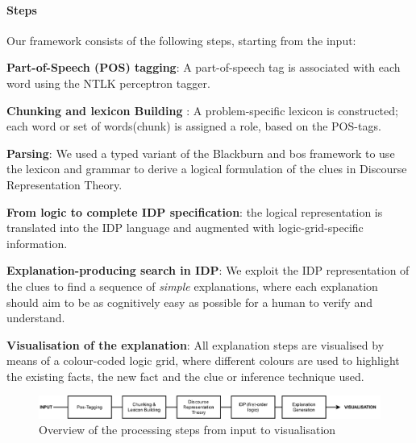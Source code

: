 \documentclass{article}
\begin{document}
\paragraph{Steps} Our framework consists of the following steps, starting from the input:
\begin{compactenum}
        \item \textbf{Part-of-Speech (POS) tagging}: A part-of-speech tag is associated with each word using the NTLK perceptron tagger\cite{marcus1993building}.
        \item \textbf{Chunking and lexicon Building} : A problem-specific lexicon is constructed; each word or set of words(chunk) is assigned a role, based on the POS-tags.
        \item \textbf{Parsing}: We used a typed variant of the Blackburn and bos framework to use the lexicon and grammar to derive a logical formulation of the clues in Discourse Representation Theory.
        \item \textbf{From logic to complete IDP specification}: the logical representation is translated into the IDP language and augmented with logic-grid-specific information.
        \item \textbf{Explanation-producing search in IDP}: We exploit the IDP representation of the clues to find a sequence of \textit{simple} explanations, where each explanation should aim to be as cognitively easy as possible for a human to verify and understand. 
        \item \textbf{Visualisation of the explanation}: All explanation steps are visualised by means of a colour-coded logic grid, where different colours are used to highlight the existing facts, the new fact and the clue or inference technique used.
\end{compactenum}

\begin{figure}[t]
    \centering
    \includegraphics[width=\linewidth]{ijcaidemo-1.png}
    \caption{Overview of the processing steps from input to visualisation}
    \label{fig:infopipeline}
\end{figure}
\end{document}

